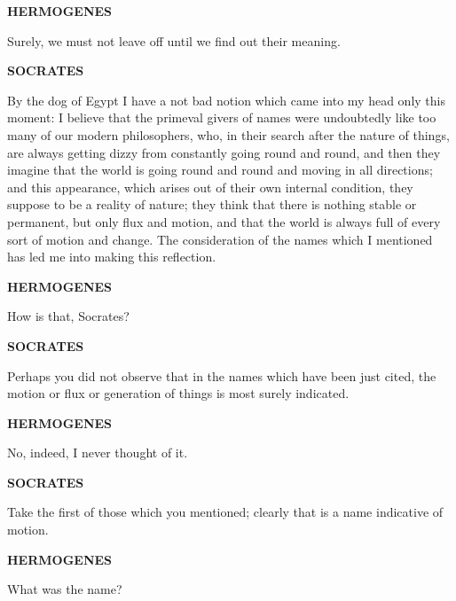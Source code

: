 \documentclass[11pt,letter]{article}
\begin{document}
\par \textbf{HERMOGENES}
\par   Surely, we must not leave off until we find out their meaning.

\par \textbf{SOCRATES}
\par   By the dog of Egypt I have a not bad notion which came into my head only this moment:  I believe that the primeval givers of names were undoubtedly like too many of our modern philosophers, who, in their search after the nature of things, are always getting dizzy from constantly going round and round, and then they imagine that the world is going round and round and moving in all directions; and this appearance, which arises out of their own internal condition, they suppose to be a reality of nature; they think that there is nothing stable or permanent, but only flux and motion, and that the world is always full of every sort of motion and change. The consideration of the names which I mentioned has led me into making this reflection.

\par \textbf{HERMOGENES}
\par   How is that, Socrates?

\par \textbf{SOCRATES}
\par   Perhaps you did not observe that in the names which have been just cited, the motion or flux or generation of things is most surely indicated.

\par \textbf{HERMOGENES}
\par   No, indeed, I never thought of it.

\par \textbf{SOCRATES}
\par   Take the first of those which you mentioned; clearly that is a name indicative of motion.

\par \textbf{HERMOGENES}
\par   What was the name?
\end{document}
